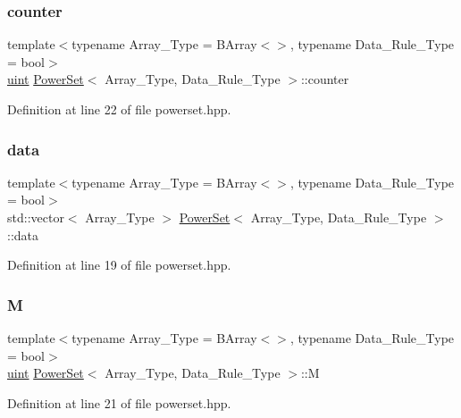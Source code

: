 \subsubsection{\texorpdfstring{counter}{counter}}
{\footnotesize\ttfamily template$<$typename Array\+\_\+\+Type  = B\+Array$<$$>$, typename Data\+\_\+\+Rule\+\_\+\+Type  = bool$>$ \\
\hyperlink{typedefs_8hpp_a91ad9478d81a7aaf2593e8d9c3d06a14}{uint} \hyperlink{class_power_set}{Power\+Set}$<$ Array\+\_\+\+Type, Data\+\_\+\+Rule\+\_\+\+Type $>$\+::counter}



Definition at line 22 of file powerset.\+hpp.

\mbox{\label{class_power_set_af456c157d157692ba5890c549c51af75}} 
\subsubsection{\texorpdfstring{data}{data}}
{\footnotesize\ttfamily template$<$typename Array\+\_\+\+Type  = B\+Array$<$$>$, typename Data\+\_\+\+Rule\+\_\+\+Type  = bool$>$ \\
std\+::vector$<$ Array\+\_\+\+Type $>$ \hyperlink{class_power_set}{Power\+Set}$<$ Array\+\_\+\+Type, Data\+\_\+\+Rule\+\_\+\+Type $>$\+::data}



Definition at line 19 of file powerset.\+hpp.

\mbox{\label{class_power_set_a91d328d5ace1ed6a8587a66af905ae98}} 
\subsubsection{\texorpdfstring{M}{M}}
{\footnotesize\ttfamily template$<$typename Array\+\_\+\+Type  = B\+Array$<$$>$, typename Data\+\_\+\+Rule\+\_\+\+Type  = bool$>$ \\
\hyperlink{typedefs_8hpp_a91ad9478d81a7aaf2593e8d9c3d06a14}{uint} \hyperlink{class_power_set}{Power\+Set}$<$ Array\+\_\+\+Type, Data\+\_\+\+Rule\+\_\+\+Type $>$\+::M}



Definition at line 21 of file powerset.\+hpp.

\mbox{\label{class_power_set_ab3b65c1b9bce012f4aabe5acae093acd}} 
